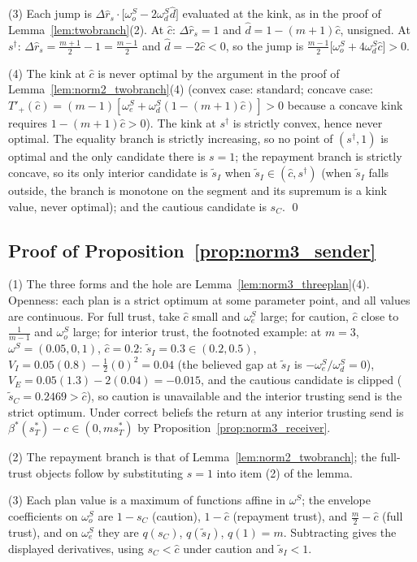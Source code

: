 \documentclass[11pt]{article}
\theoremstyle{plain}
\theoremstyle{remark}
\begin{document}
(3) Each jump is $\Delta\hat r_s\cdot\big[\omega_o^S-2\omega_d^S\hat d\big]$ evaluated at the kink, as in the proof of Lemma~\ref{lem:twobranch}(2).  At $\hat c$: $\Delta\hat r_s=1$ and $\hat d=1-(m+1)\hat c$, unsigned.  At $s^\dagger$: $\Delta\hat r_s=\frac{m+1}2-1=\frac{m-1}2$ and $\hat d=-2\hat c<0$, so the jump is $\frac{m-1}2\big[\omega_o^S+4\omega_d^S\hat c\big]>0$.

(4) The kink at $\hat c$ is never optimal by the argument in the proof of Lemma~\ref{lem:norm2_twobranch}(4) (convex case: standard; concave case: $T'_+(\hat c)=(m-1)[\omega_e^S+\omega_d^S(1-(m+1)\hat c)]>0$ because a concave kink requires $1-(m+1)\hat c>0$).  The kink at $s^\dagger$ is strictly convex, hence never optimal.  The equality branch is strictly increasing, so no point of $(s^\dagger,1)$ is optimal and the only candidate there is $s=1$; the repayment branch is strictly concave, so its only interior candidate is $\tilde s_I$ when $\tilde s_I\in(\hat c,s^\dagger)$ (when $\tilde s_I$ falls outside, the branch is monotone on the segment and its supremum is a kink value, never optimal); and the cautious candidate is $s_C$.
\qed

\subsection*{Proof of Proposition~\ref{prop:norm3_sender}}

(1) The three forms and the hole are Lemma~\ref{lem:norm3_threeplan}(4).  Openness: each plan is a strict optimum at some parameter point, and all values are continuous.  For full trust, take $\hat c$ small and $\omega_e^S$ large; for caution, $\hat c$ close to $\frac1{m-1}$ and $\omega_o^S$ large; for interior trust, the footnoted example: at $m=3$, $\omega^S=(0.05,0,1)$, $\hat c=0.2$: $\tilde s_I=0.3\in(0.2,0.5)$, $V_I=0.05(0.8)-\tfrac12(0)^2=0.04$ (the believed gap at $\tilde s_I$ is $-\omega_e^S/\omega_d^S=0$), $V_E=0.05(1.3)-2(0.04)=-0.015$, and the cautious candidate is clipped ($\tilde s_C=0.2469>\hat c$), so caution is unavailable and the interior trusting send is the strict optimum.  Under correct beliefs the return at any interior trusting send is $\beta^\ast(s_T^\ast)-c\in(0,ms_T^\ast)$ by Proposition~\ref{prop:norm3_receiver}.

(2) The repayment branch is that of Lemma~\ref{lem:norm2_twobranch}; the full-trust objects follow by substituting $s=1$ into item (2) of the lemma.

(3) Each plan value is a maximum of functions affine in $\omega^S$; the envelope coefficients on $\omega_o^S$ are $1-s_C$ (caution), $1-\hat c$ (repayment trust), and $\frac m2-\hat c$ (full trust), and on $\omega_e^S$ they are $q(s_C)$, $q(\tilde s_I)$, $q(1)=m$.  Subtracting gives the displayed derivatives, using $s_C<\hat c$ under caution and $\tilde s_I<1$.
\end{document}
